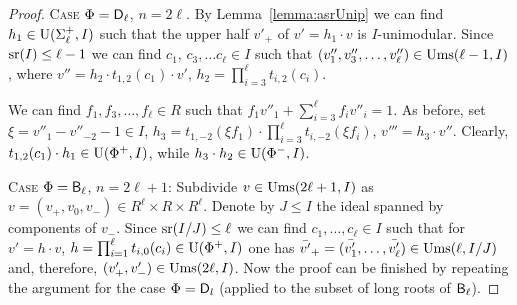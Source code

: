 \begin{proof}
\textsc{Case $\Phi=\mathsf{D}_\ell$, $n= 2\ell$.} 
By Lemma~\ref{lemma:asrUnip} we can find $h_1\in \operatorname{U}(\Sigma^+_\ell, I)$ such that the upper half $v'_+$ of $v'=h_1 \cdot v$ is $I$-unimodular.
Since $\operatorname{sr}(I)\leq \ell-1$ we can find $c_1$, $c_3, \ldots c_\ell \in I$ such that $(v''_1, v''_3, \ldots, v''_\ell) \in \operatorname{Ums}(\ell-1, I)$, where
$v''=h_2 \cdot t_{1,2}(c_1) \cdot v'$, $h_2=\prod_{i=3}^\ell t_{i,2}(c_i)$.

We can find $f_1, f_3,\ldots, f_\ell \in R$ such that $f_1v''_1+\sum_{i=3}^\ell f_i v''_{i} = 1$.
As before, set $\xi = v''_1-v''_{-2}-1 \in I$, $h_3 = t_{1,-2}(\xi f_1) \cdot \prod_{i=3}^\ell t_{i,-2}(\xi f_i)$, $v'''=h_3 \cdot v''$.
Clearly, $t_{1,2}(c_1) \cdot h_1 \in \operatorname{U}(\Phi^+, I)$, while $ h_3 \cdot h_2 \in \operatorname{U}(\Phi^-, I)$.

\textsc{Case $\Phi=\mathsf{B}_\ell$, $n=2\ell+1$:} Subdivide $v\in \operatorname{Ums}(2\ell+1, I)$ as $v=(v_+, v_0, v_-)\in R^\ell\times R\times R^\ell$.
Denote by $J\leq I$ the ideal spanned by components of $v_-$.
Since $\operatorname{sr}(I/J)\leq \ell$ we can find $c_1,\dots,c_\ell\in I$ such that for $v' = h \cdot v$, $h = \prod_{i=1}^\ell t_{i, 0}(c_i) \in \operatorname{U}(\Phi^+, I)$
one has $\bar{v'}_+=(\bar{v'_1},\ldots, \bar{v'_\ell}) \in \operatorname{Ums}(\ell, I/J)$ and, therefore, $(v'_+, v'_-) \in \operatorname{Ums}(2\ell, I)$.
Now the proof can be finished by repeating the argument for the case $\Phi=\mathsf{D}_l$ (applied to the subset of long roots of $\mathsf{B}_\ell$).
\end{proof}

